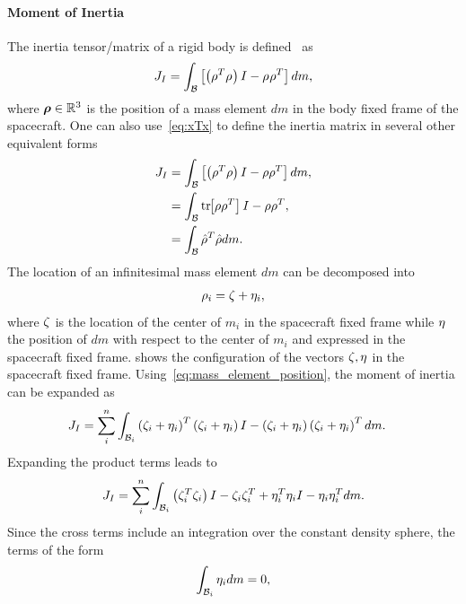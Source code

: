 \paragraph{Moment of Inertia}\label{sec:moment_of_inertia}
The inertia tensor/matrix of a rigid body is defined~\cite{greenwood1988} as
\begin{align}\label{eq:moi_definition}
    J_I = \int_{\mathcal{B}} \left[  \left( \rho_{}^T \rho_{}  \right)I - \rho_{}\rho_{}^T \right] dm, 
\end{align}
where \( \bm{\rho} \in \mathbb{R}^3 \) is the position of a mass element \( dm \) in the body fixed frame of the spacecraft.
One can also use~\cref{eq:xTx} to define the inertia matrix in several other equivalent forms
\begin{align*}
    J_I &= \int_{\mathcal{B}} \left[  \left( \rho^T \rho  \right)I - \rho\rho^T \right] dm, \\
        &= \int_{\mathcal{B}} \mathrm{tr}\negthickspace\left[ \rho\rho^T \right] I - \rho\rho^T, \\
        &= \int_{\mathcal{B}} \hat{\rho}^T \hat{\rho} dm.
\end{align*}
The location of an infinitesimal mass element \( dm \) can be decomposed into
\begin{align}\label{eq:mass_element_position}
    \rho_i = \zeta + \eta_i, 
\end{align}
where \( \zeta \) is the location of the center of \( m_i \) in the spacecraft fixed frame while \( \eta \) the position of \( dm \) with respect to the center of \( m_i \) and expressed in the spacecraft fixed frame.
 shows the configuration of the vectors \( \zeta, \eta \) in the spacecraft fixed frame.
Using~\cref{eq:mass_element_position}, the moment of inertia can be expanded as
\begin{align*}
    J_I &= \sum_i^n \int_{\mathcal{B}_i} \left( \zeta_i + \eta_i \right)^T \left( \zeta_i + \eta_i  \right) I  - \left( \zeta_i + \eta_i \right) \left( \zeta_i + \eta_i \right)^T dm .
\end{align*}
Expanding the product terms leads to
\begin{align*}
    J_I = \sum_i^n \int_{\mathcal{B}_i} \left( \zeta_i^T \zeta_i \right)I - \zeta_i \zeta_i^T + \eta_i^T \eta_i I - \eta_i \eta_i^T dm.
\end{align*}
Since the cross terms include an integration over the constant density sphere, the terms of the form
\begin{align*}
    \int_{\mathcal{B}_i} \eta_i dm = 0,
\end{align*}
